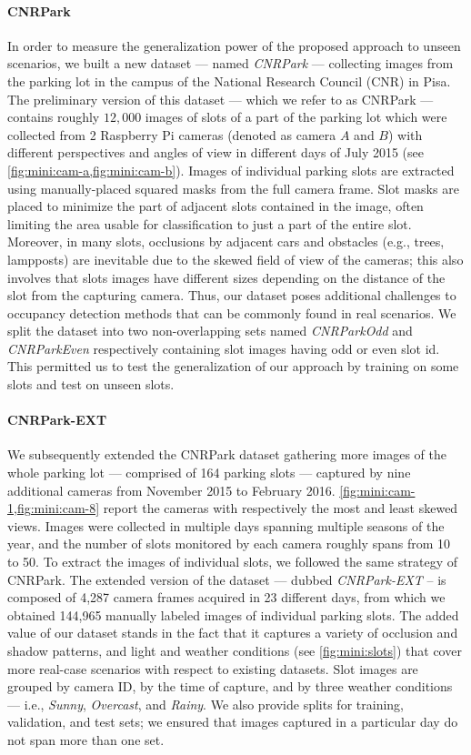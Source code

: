 \paragraph{CNRPark}
In order to measure the generalization power of the proposed approach to unseen scenarios, we built a new dataset --- named \emph{CNRPark} --- collecting images from the parking lot in the campus of the National Research Council (CNR) in Pisa.
The preliminary version of this dataset --- which we refer to as CNRPark --- contains roughly $12,000$ images of slots of a part of the parking lot which were collected from 2 Raspberry Pi cameras (denoted as camera $A$ and $B$) with different perspectives and angles of view in different days of July 2015 (see \ref{fig:mini:cam-a,fig:mini:cam-b}).
Images of individual parking slots are extracted using manually-placed squared masks from the full camera frame.
Slot masks are placed to minimize the part of adjacent slots contained in the image, often limiting the area usable for classification to just a part of the entire slot.
Moreover, in many slots, occlusions by adjacent cars and obstacles (e.g., trees, lampposts) are inevitable due to the skewed field of view of the cameras;
this also involves that slots images have different sizes depending on the distance of the slot from the capturing camera.
Thus, our dataset poses additional challenges to occupancy detection methods that can be commonly found in real scenarios.
We split the dataset into two non-overlapping sets named \emph{CNRParkOdd} and \emph{CNRParkEven} respectively containing slot images having odd or even slot id.
This permitted us to test the generalization of our approach by training on some slots and test on unseen slots.

\paragraph{CNRPark-EXT}
We subsequently extended the CNRPark dataset gathering more images of the whole parking lot --- comprised of 164 parking slots --- captured by nine additional cameras from November 2015 to February 2016.
\ref{fig:mini:cam-1,fig:mini:cam-8} report the cameras with respectively the most and least skewed views.
Images were collected in multiple days spanning multiple seasons of the year, and the number of slots monitored by each camera roughly spans from 10 to 50.
To extract the images of individual slots, we followed the same strategy of CNRPark.
The extended version of the dataset --- dubbed \emph{CNRPark-EXT} -- is composed of 4,287 camera frames acquired in 23 different days, from which we obtained 144,965 manually labeled images of individual parking slots.
The added value of our dataset stands in the fact that it captures a variety of occlusion and shadow patterns, and light and weather conditions (see \ref{fig:mini:slots}) that cover more real-case scenarios with respect to existing datasets.
Slot images are grouped by camera ID, by the time of capture, and by three weather conditions --- i.e., \emph{Sunny}, \emph{Overcast}, and \emph{Rainy}.
We also provide splits for training, validation, and test sets;
we ensured that images captured in a particular day do not span more than one set.

